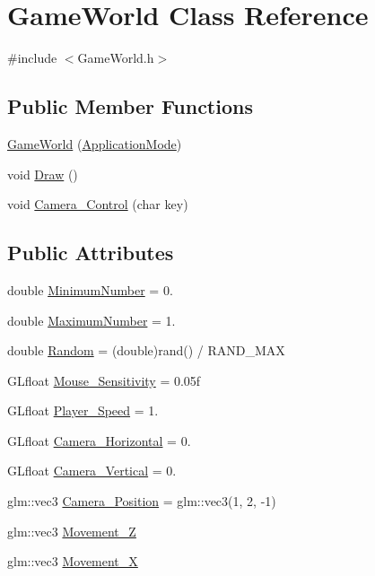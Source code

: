 \hypertarget{classGameWorld}{}\section{Game\+World Class Reference}
\label{classGameWorld}


{\ttfamily \#include $<$Game\+World.\+h$>$}

\subsection*{Public Member Functions}
\begin{DoxyCompactItemize}
\item 
\hyperlink{classGameWorld_a17a84e57a80600961088afc753036f89}{Game\+World} (\hyperlink{common_8h_add86e7c88dd109abea3f708b422f31f0}{Application\+Mode})
\item 
void \hyperlink{classGameWorld_a275418607d8286979b276f165ad5876b}{Draw} ()
\item 
void \hyperlink{classGameWorld_a43080b1c693798b12f7faf28a6b45ab5}{Camera\+\_\+\+Control} (char key)
\end{DoxyCompactItemize}
\subsection*{Public Attributes}
\begin{DoxyCompactItemize}
\item 
double \hyperlink{classGameWorld_a54ccf4cf03172ab8779e9c326c8846ed}{Minimum\+Number} = 0.
\item 
double \hyperlink{classGameWorld_a1cddcf233625a98581eaeb9fd7c8c574}{Maximum\+Number} = 1.
\item 
double \hyperlink{classGameWorld_a56652cc9880b3ba1be61395066c863c3}{Random} = (double)rand() / R\+A\+N\+D\+\_\+\+M\+A\+X
\item 
G\+Lfloat \hyperlink{classGameWorld_a9bf4eb977e6ab9299aaef1345c4fa4dd}{Mouse\+\_\+\+Sensitivity} = 0.\+05f
\item 
G\+Lfloat \hyperlink{classGameWorld_ae8ab2ac372729cec44ea316f6bdf45ca}{Player\+\_\+\+Speed} = 1.
\item 
G\+Lfloat \hyperlink{classGameWorld_a7f4911dda9b3b4e4eb03ece87e16cd96}{Camera\+\_\+\+Horizontal} = 0.
\item 
G\+Lfloat \hyperlink{classGameWorld_a26658e739c4d267b1be35ed820089931}{Camera\+\_\+\+Vertical} = 0.
\item 
glm\+::vec3 \hyperlink{classGameWorld_ad80e597474ea4c52a583e81788187571}{Camera\+\_\+\+Position} = glm\+::vec3(1, 2, -\/1)
\item 
glm\+::vec3 \hyperlink{classGameWorld_a8dd30ba92e7fa9b9b05075e31d1e7dd8}{Movement\+\_\+\+Z}
\item 
glm\+::vec3 \hyperlink{classGameWorld_a968eb29424b68f7cd79a5896c62e944d}{Movement\+\_\+\+X}
\end{DoxyCompactItemize}



